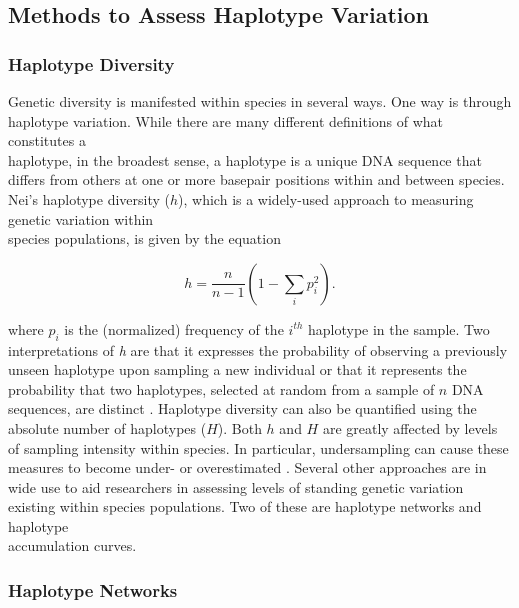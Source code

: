 \subsection{Methods to Assess Haplotype Variation}

\subsubsection{Haplotype Diversity}

Genetic diversity is manifested within species in several ways. One way is through haplotype variation. While there are many different definitions of what constitutes a \\ haplotype, in the broadest sense, a haplotype is a unique DNA sequence that differs from others at one or more basepair positions within and between species. Nei's \cite{nei1987molecular} haplotype diversity ($h$), which is a widely-used approach to measuring genetic variation within \\ species populations, is given by the equation 

\begin{equation}
h = \frac{n}{n-1}\left(1 - \sum_i{p_i^2}\right).
\end{equation}

\vspace{5mm}

\noindent where $p_i$ is the (normalized) frequency of the $i^{th}$ haplotype in the sample. Two \\ interpretations of \textit{h} are that it expresses the probability of observing a previously unseen haplotype upon sampling a new individual \cite{wares2015can} or that it represents the probability that two haplotypes, selected at random from a sample of $n$ DNA sequences, are distinct \cite{goodall2012comparison}. Haplotype diversity can also be quantified using the absolute number of haplotypes ($H$). Both $h$ and $H$ are greatly affected by levels of sampling intensity within species. In particular, undersampling can cause these measures to become under- or overestimated \cite{goodall2012comparison}. Several other approaches are in wide use to aid researchers in assessing levels of standing genetic variation existing within species populations. Two of these are haplotype networks and haplotype \\ accumulation curves. 

\vspace{5mm}

\subsubsection{Haplotype Networks} 

